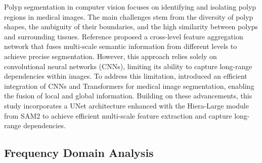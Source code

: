 Polyp segmentation in computer vision focuses on identifying and isolating polyp regions in medical images. The main challenges stem from the diversity of polyp shapes, the ambiguity of their boundaries, and the high similarity between polyps and surrounding tissues. Reference \cite{CFANet} proposed a cross-level feature aggregation network that fuses multi-scale semantic information from different levels to achieve precise segmentation. However, this approach relies solely on convolutional neural networks (CNNs), limiting its ability to capture long-range dependencies within images.
To address this limitation, \cite{H2Former} introduced an efficient integration of CNNs and Transformers for medical image segmentation, enabling the fusion of local and global information. Building on these advancements, this study incorporates a UNet architecture enhanced with the Hiera-Large module from SAM2 to achieve efficient multi-scale feature extraction and capture long-range dependencies.

\subsection{Frequency Domain Analysis}

